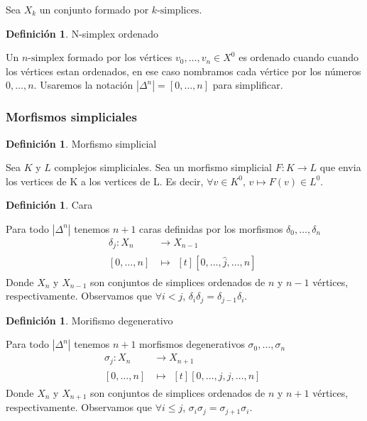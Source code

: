 \documentclass[11pt,a4paper,openright,oneside]{article}
\numberwithin{equation}{section}
\theoremstyle{definition}
\newtheorem{defi}[teo]{Definici\'on}
\begin{document}
Sea $X_k$ un conjunto formado por $k\text{-simplices}$.

\begin{defi}
    N-simplex ordenado
\end{defi}
Un $n\text{-simplex}$ formado por los v\'ertices $v_0,\dots,v_n \in X^0$ es ordenado cuando cuando los v\'ertices estan ordenados, en ese caso nombramos cada v\'ertice por los n\'umeros $0,\dots,n$. Usaremos la notaci\'on $|\Delta^n| = [0,\dots,n]$ para simplificar.


\subsubsection{Morfismos simpliciales}
\begin{defi}
    Morfismo simplicial
\end{defi}
Sea $K$ y $L$ complejos simpliciales. Sea un morfismo simplicial $F: K \longrightarrow L$ que envia los vertices de K a los vertices de L. Es decir, $\forall v \in K^0 \text{, } v \longmapsto F(v) \in L^0$.

\begin{defi}
    Cara
\end{defi}
Para todo $|\Delta^n|$ tenemos $n+1$ caras definidas por los morfismos $\delta_0,\dots,\delta_n$
\begin{align*}
    \delta_j: X_n & \longrightarrow X_{n-1} \\
    [0,\dots,n]   & \longmapsto\!
    \begin{aligned}[t]
        [0,\dots,\hat{j},\dots,n]
    \end{aligned}
\end{align*}
Donde $X_n$ y $X_{n-1}$ son conjuntos de simplices ordenados de $n$ y $n-1$ v\'ertices, respectivamente. Observamos que $\forall i<j$, $\delta_i\delta_j = \delta_{j-1}\delta_{i}$.

\begin{defi}
    Morifismo degenerativo
\end{defi}
Para todo $|\Delta^n|$ tenemos $n+1$ morfismos degenerativos $\sigma_0,\dots,\sigma_n$
\begin{align*}
    \sigma_j: X_n & \longrightarrow X_{n+1} \\
    [0,\dots,n]   & \longmapsto\!
    \begin{aligned}[t]
        [0,\dots,j,j,\dots,n]
    \end{aligned}
\end{align*}
Donde $X_n$ y $X_{n+1}$ son conjuntos de simplices ordenados de $n$ y $n+1$ v\'ertices, respectivamente. Observamos que $\forall i\le j$, $\sigma_i\sigma_j = \sigma_{j+1}\sigma_{i}$.
\end{document}
